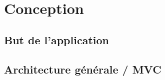 
\section{Conception}

\subsection{But de l'application}

\subsection{Architecture générale / MVC}


